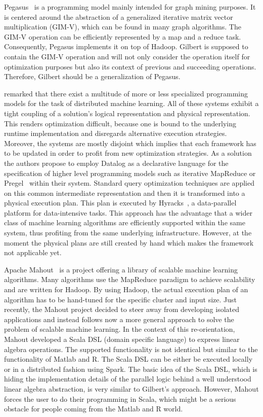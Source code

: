Pegasus~\cite{kang:2009a} is a programming model mainly intended for graph mining purposes.
It is centered around the abstraction of a generalized iterative matrix vector multiplication (GIM-V), which can be found in many graph algorithms.
The GIM-V operation can be efficiently represented by a map and a reduce task.
Consequently, Pegasus implements it on top of Hadoop.
Gilbert is supposed to contain the GIM-V operation and will not only consider the operation itself for optimization purposes but also its context of previous and succeeding operations.
Therefore, Gilbert should be a generalization of Pegasus.

\Textcite{bu:apa2012a} remarked that there exist a multitude of more or less specialized programming models for the task of distributed machine learning.
All of these systems exhibit a tight coupling of a solution's logical representation and physical representation.
This renders optimization difficult, because one is bound to the underlying runtime implementation and disregards alternative execution strategies.
Moreover, the systems are mostly disjoint which implies that each framework has to be updated in order to profit from new optimization strategies.
As a solution the authors propose to employ Datalog as a declarative language for the specification of higher level programming models such as iterative MapReduce or Pregel~\cite{malewicz:2010a} within their system.
Standard query optimization techniques are applied on this common intermediate representation and then it is transformed into a physical execution plan.
This plan is executed by Hyracks~\cite{borkar:2011a}, a data-parallel platform for data-intensive tasks.
This approach has the advantage that a wider class of machine learning algorithms are efficiently supported within the same system, thus profiting from the same underlying infrastructure.
However, at the moment the physical plans are still created by hand which makes the framework not applicable yet.

Apache Mahout~\cite{mahout:2011a} is a project offering a library of scalable machine learning algorithms.
Many algorithms use the MapReduce paradigm to achieve scalability and are written for Hadoop.
By using Hadoop, the actual execution plan of an algorithm has to be hand-tuned for the specific cluster and input size.
Just recently, the Mahout project decided to steer away from developing isolated applications and instead follows now a more general approach to solve the problem of scalable machine learning.
In the context of this re-orientation, Mahout developed a Scala DSL (domain specific language) to express linear algebra operations.
The supported functionality is not identical but similar to the functionality of Matlab and R.
The Scala DSL can be either be executed locally or in a distributed fashion using Spark.
The basic idea of the Scala DSL, which is hiding the implementation details of the parallel logic behind a well understood linear algebra abstraction, is very similar to Gilbert's approach.
However, Mahout forces the user to do their programming in Scala, which might be a serious obstacle for people coming from the Matlab and R world. 

